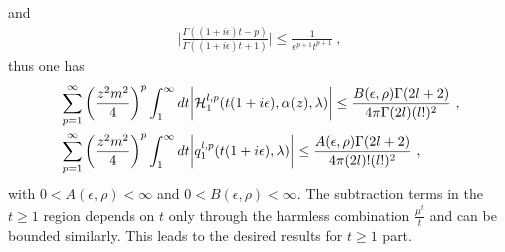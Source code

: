 \documentclass[a4paper,11pt]{article}
\begin{document}
and 
\begin{align}
\bigg|\frac{\Gamma((1+i\epsilon)t-p)}{\Gamma((1+i\epsilon)t+1)}\bigg| \le \frac{1}{\epsilon^{p+1} t^{p+1}} \ ,
\end{align}
thus one has
\begin{align}
&\sum_{p=1}^{\infty}\left(\frac{z^2m^2}{4}\right)^p\int_{1}^{\infty} dt \bigg|{\cal H}_1^{l,p}(t(1+i\epsilon ),\alpha(z),\lambda)\bigg| \le \frac{B(\epsilon,\rho)\Gamma(2l+2)}{4\pi \Gamma(2l)(l!)^2} \ , \\
&\sum_{p=1}^{\infty}\left(\frac{z^2m^2}{4}\right)^p\int_{1}^{\infty} dt \bigg|{q}_1^{l,p}(t(1+i\epsilon ),\lambda)\bigg| \le \frac{A(\epsilon,\rho)\Gamma(2l+2)}{4\pi (2l)!(l!)^2} \ ,
\end{align}
with $0<A(\epsilon,\rho)<\infty$ and $0<B(\epsilon,\rho)<\infty$. The subtraction terms in the $t\ge 1$ region depends on $t$ only through the harmless combination $\frac{\mu^t}{t}$ and can be bounded similarly. This leads to the desired results for $t\ge 1$ part. 
\end{document}
